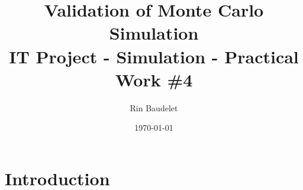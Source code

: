 \documentclass[12pt,a4paper]{article}
\title{Validation of Monte Carlo Simulation\\ \small{IT Project - Simulation - Practical Work \#4}}
\author{Rin Baudelet}
\date{\today}
\begin{document}
\maketitle 
\section*{Introduction}
\end{document}
